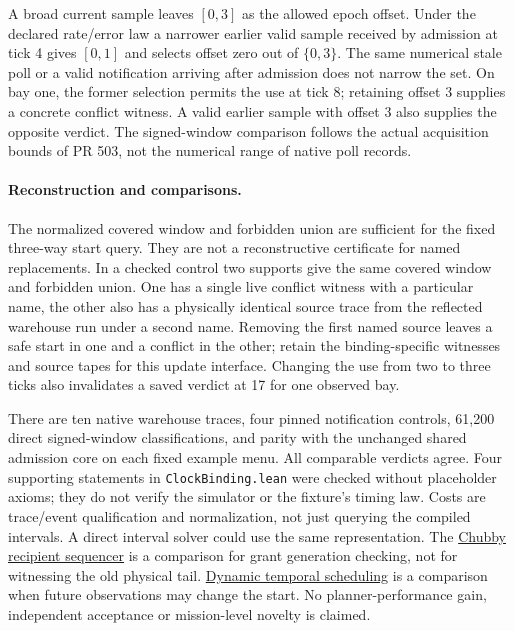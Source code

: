 \documentclass[11pt]{article}
\begin{document}
A broad current sample leaves $[0,3]$ as the allowed epoch offset.
Under the declared rate/error law a narrower earlier valid sample
received by admission at tick 4 gives $[0,1]$ and selects offset
zero out of $\{0,3\}$. The same numerical stale poll or a valid
notification arriving after admission does not narrow the set.
On bay one, the former selection permits the use at tick 8;
retaining offset 3 supplies a concrete conflict witness. A valid
earlier sample with offset 3 also supplies the opposite verdict.
The signed-window comparison follows the actual acquisition bounds
of PR 503, not the numerical range of native poll records.

\paragraph{Reconstruction and comparisons.}
The normalized covered window and forbidden union are sufficient
for the fixed three-way start query. They are not a reconstructive
certificate for named replacements. In a checked control two
supports give the same covered window and forbidden union. One
has a single live conflict witness with a particular name, the
other also has a physically identical source trace from the
reflected warehouse run under a second name. Removing the first
named source leaves a safe start in one and a conflict in the
other; retain the binding-specific witnesses and source tapes for
this update interface. Changing the use from two to three ticks
also invalidates a saved verdict at 17 for one observed bay.

There are ten native warehouse traces, four pinned notification
controls, 61,200 direct signed-window classifications, and parity
with the unchanged shared admission core on each fixed example
menu. All comparable verdicts agree. Four supporting statements
in \texttt{ClockBinding.lean} were checked without placeholder
axioms; they do not verify the simulator or the fixture's timing
law. Costs are trace/event qualification and normalization, not
just querying the compiled intervals. A direct interval solver
could use the same representation. The
\href{https://static.usenix.org/events/osdi06/tech/full_papers/burrows/burrows_html/}{Chubby recipient sequencer}
is a comparison for grant generation checking, not for witnessing
the old physical tail. \href{https://ijcai.org/proceedings/2001/69}{Dynamic
temporal scheduling} is a comparison when future observations may
change the start. No planner-performance gain, independent
acceptance or mission-level novelty is claimed.
\end{document}
